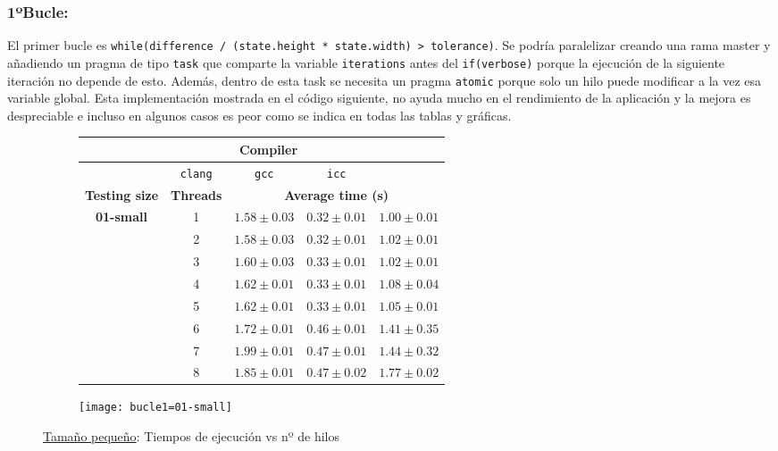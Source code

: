 
\subsubsection{\textbf{1ºBucle:}}
\par El primer bucle es \texttt{while(difference / (state.height * state.width) > tolerance)}. Se podría paralelizar creando una rama master y añadiendo un pragma de tipo
\texttt{task} que comparte la variable \texttt{iterations} antes del \texttt{if(verbose)} porque la ejecución de la siguiente iteración no depende de esto.
Además, dentro de esta task se necesita un pragma \texttt{atomic} porque solo un hilo puede modificar a la vez esa variable global. Esta
implementación mostrada en el código siguiente, no ayuda mucho en el rendimiento de la aplicación y la mejora es despreciable e incluso en 
algunos casos es peor como se indica en todas las tablas y gráficas.
\begin{figure}[H]
    \centering
    \begin{subfigure}{0.4\textwidth}
        \begin{adjustbox}{width=\textwidth} 
        \begin{tabular}{|c|c|c|c|c|}
            \hline
            \rowcolor{azul} \multicolumn{2}{|c|}{}&\multicolumn{3}{c|}{\textbf{Compiler}} \\ \hline
            \rowcolor{azul} \multicolumn{2}{|c|}{}&\texttt{clang}&\texttt{gcc}&\texttt{icc}\\ \hline
            \rowcolor{azul} \textbf{Testing size} & \textbf{Threads}&\multicolumn{3}{c|}{\textbf{Average time (s)}} \\ \hline
            \multirow{8}{1cm}{\textbf{01-small}} & 1 & \(1.58\pm{0.03}\) & \(0.32\pm{0.01}\) & \(1.00\pm{0.01}\) \\ \cline{2-5}
            & 2 & \(1.58\pm{0.03}\) & \(0.32\pm{0.01}\) & \(1.02\pm{0.01}\) \\ \cline{2-5}
            & 3 & \(1.60\pm{0.03}\) & \(0.33\pm{0.01}\) & \(1.02\pm{0.01}\) \\ \cline{2-5}
            & 4 & \(1.62\pm{0.01}\) & \(0.33\pm{0.01}\) & \(1.08\pm{0.04}\) \\ \cline{2-5}
            & 5 & \(1.62\pm{0.01}\) & \(0.33\pm{0.01}\) & \(1.05\pm{0.01}\) \\ \cline{2-5}
            & 6 & \(1.72\pm{0.01}\) & \(0.46\pm{0.01}\) & \(1.41\pm{0.35}\) \\ \cline{2-5}
            & 7 & \(1.99\pm{0.01}\) & \(0.47\pm{0.01}\) & \(1.44\pm{0.32}\) \\ \cline{2-5}
            & 8 & \(1.85\pm{0.01}\) & \(0.47\pm{0.02}\) & \(1.77\pm{0.02}\) \\ \hline
        \end{tabular}
        \end{adjustbox}
    \end{subfigure}
    \hfill
    \begin{subfigure}{0.5\textwidth}
        \texttt{[image: bucle1=01-small]}
    \end{subfigure}
    \caption{\underline{Tamaño pequeño}: Tiempos de ejecución vs nº de hilos}
    \label{fig:bucle1=01-small}
\end{figure}
